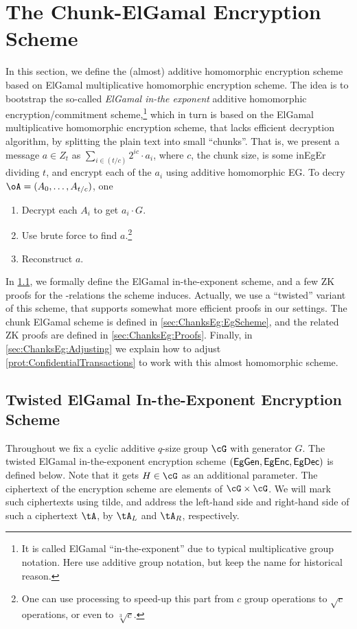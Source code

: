 \newcommand{\PedEncs}{{\sf PedEnc}}
\newcommand{\rPedEnc}{\cR_\PedEncs}

\newcommand{\rPedEncDef}
{
	\sset{((H,A),(a,r))\colon \Ped_H(a;r)= A}
}





\section{The Chunk-ElGamal  Encryption Scheme}\label{sec:ChanksEg}
In this section, we define the  (almost) additive homomorphic encryption scheme based on ElGamal multiplicative  homomorphic encryption scheme.  
The idea is to bootstrap the so-called   \textit{ElGamal in-the exponent}   additive homomorphic encryption/commitment  scheme,\footnote{It is called ElGamal ``in-the-exponent'' due to typical multiplicative group notation. Here use additive group notation, but keep the name for historical reason.}  which in turn is based on the  ElGamal multiplicative  homomorphic encryption scheme, that lacks efficient decryption algorithm, by splitting the plain text into small ``chunks''. That  is, we present a message $a\in Z_t$ as $\sum_{i \in (t/c)}   2^{i c} \cdot a_i$, where $c$, the chunk size, is  some inEgEr  dividing $t$, and encrypt each of the $a_i$ using    additive homomorphic EG. To decry $\oA= (A_0,\ldots,A_{t/c})$, one  
\begin{enumerate}
	\item Decrypt   each $A_i$ to get $a_i  \cdot G$.
	\item Use brute force to find $a$.\footnote{One can use    processing to speed-up this part from $c$ group operations to $\sqrt{c}$  operations, or even  to   $\sqrt[3]{c}$.}
	
	\item Reconstruct $a$.
\end{enumerate}
In \cref{sec:ChanksEg:Eg}, we formally define the  ElGamal in-the-exponent scheme, and a few ZK proofs for the \NP-relations the scheme induces. Actually, we use a ``twisted'' variant of this scheme, that supports somewhat more efficient proofs in our settings.   The chunk ElGamal  scheme is defined in \cref{sec:ChanksEg:EgScheme}, and the related ZK proofs are defined in \cref{sec:ChanksEg:Proofs}. Finally, in \cref{sec:ChanksEg:Adjusting} we explain  how to adjust \cref{prot:ConfidentialTransactions} to work with this almost homomorphic scheme.

\subsection{Twisted ElGamal In-the-Exponent Encryption Scheme}\label{sec:ChanksEg:Eg}
Throughout we fix a cyclic  additive $q$-size group $\cG$ with generator $G$. The  twisted ElGamal in-the-exponent encryption scheme $(\mathsf{EgGen},\mathsf{EgEnc},\mathsf{EgDec})$ is defined below. Note that it  gets  $H\in \cG$ as an  additional parameter. The ciphertext of the encryption scheme are elements of $\cG \times \cG$. We will mark such  ciphertexts   using tilde, and  address  the left-hand side and right-hand side of such  a ciphertext $\tA$,  by $\tA_L$ and  $\tA_R$, respectively. 


